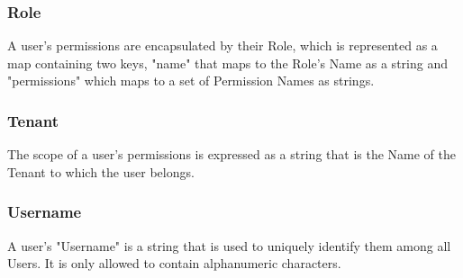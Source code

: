 \subsubsection{Role}
A user's permissions are encapsulated by their Role, which is represented as a
map containing two keys, "name" that maps to the Role's Name as a string and
"permissions" which maps to a set of Permission Names as strings.

\subsubsection{Tenant}
The scope of a user's permissions is expressed as a string that is the Name of
the Tenant to which the user belongs.

\subsubsection{Username}
A user's "Username" is a string that is used to uniquely identify them among all
Users. It is only allowed to contain alphanumeric characters.
